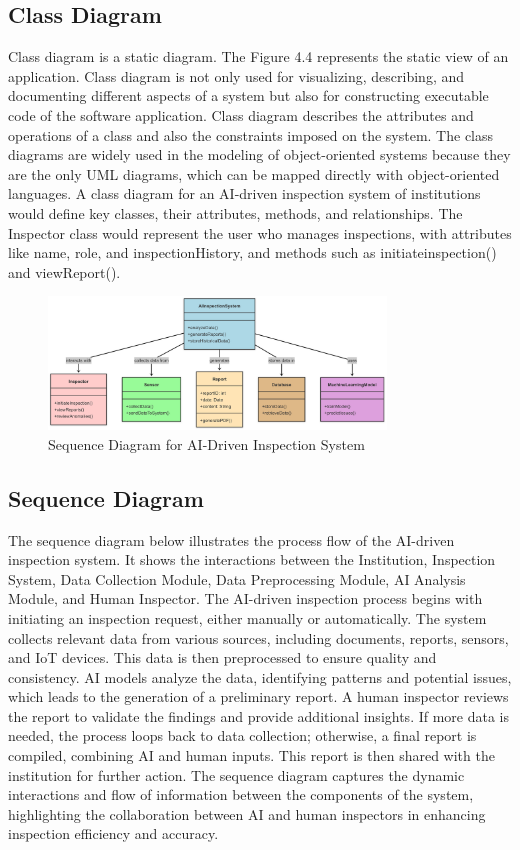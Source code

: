 \documentclass[12pt,a4paper]{report}
\begin{document}
\subsection{Class Diagram}
Class diagram is a static diagram. The Figure 4.4 represents the static view of an application. Class diagram is not only used for visualizing, describing, and documenting different aspects of a system but also for constructing executable code of the software application. Class diagram describes the attributes and operations of a class and also the constraints imposed on the system. The class diagrams are widely used in the modeling of object-oriented systems because they are the only UML diagrams, which can be mapped directly with object-oriented languages.
A class diagram for an AI-driven inspection system of institutions would define key classes, their attributes, methods, and relationships. The Inspector class would represent the user who manages inspections, with attributes like name, role, and inspectionHistory, and methods such as initiateinspection() and viewReport().
\begin{figure}[H]
    \centering
    \includegraphics[width=0.8\textwidth]{images/mermaid-ai-diagram-2025-04-27-113217.png}
    \caption{Sequence Diagram for AI-Driven Inspection System}
    \label{fig:sequence-diagram}
\end{figure}
\subsection{Sequence Diagram}
The sequence diagram below illustrates the process flow of the AI-driven inspection system. It shows the interactions between the Institution, Inspection System, Data Collection Module, Data Preprocessing Module, AI Analysis Module, and Human Inspector.
The AI-driven inspection process begins with initiating an inspection request, either manually or automatically. The system collects relevant data from various sources, including documents, reports, sensors, and IoT devices. This data is then preprocessed to ensure quality and consistency. AI models analyze the data, identifying patterns and potential issues, which leads to the generation of a preliminary report. A human inspector reviews the report to validate the findings and provide additional insights. If more data is needed, the process loops back to data collection; otherwise, a final report is compiled, combining AI and human inputs. This report is then shared with the institution for further action. The sequence diagram captures the dynamic interactions and flow of information between the components of the system, highlighting the collaboration between AI and human inspectors in enhancing inspection efficiency and accuracy.
\end{document}
